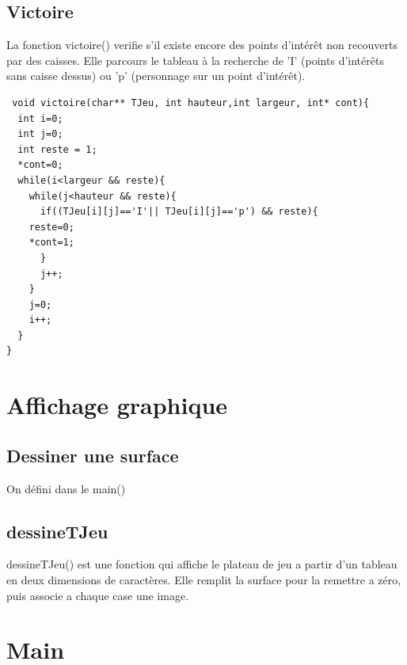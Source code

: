 \documentclass{article}
\begin{document}
\subsection{Victoire}
La fonction victoire() verifie s'il existe encore des points d'intérêt non recouverts par des caisses.
Elle parcours le tableau à la recherche de 'I' (points d'intérêts sans caisse dessus) ou 'p' (personnage sur un point d'intérêt).
\begin{verbatim}
 void victoire(char** TJeu, int hauteur,int largeur, int* cont){
  int i=0;
  int j=0;
  int reste = 1;
  *cont=0;
  while(i<largeur && reste){
    while(j<hauteur && reste){
      if((TJeu[i][j]=='I'|| TJeu[i][j]=='p') && reste){
	reste=0;
	*cont=1;
      }
      j++;
    }
    j=0;
    i++;
  }
}
\end{verbatim}

\section{Affichage graphique}

\subsection{Dessiner une surface}

On défini dans le main()


\subsection{dessineTJeu}

 dessineTJeu() est une fonction qui affiche le plateau de jeu a partir d'un tableau en deux dimensions de caractères. Elle remplit la surface pour la remettre a zéro, puis associe a chaque case une image.

\section{Main}
\end{document}
